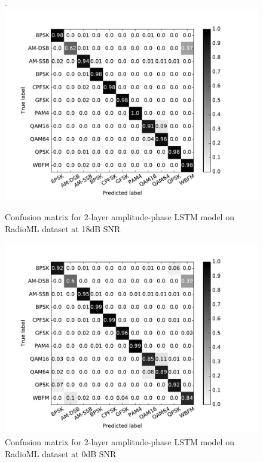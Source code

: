 \begin{figure}[htb]
\centering
-\includegraphics[width=1.1\columnwidth]{figures/confmat_18.pdf}
\caption{Confusion matrix for 2-layer amplitude-phase LSTM model on RadioML dataset at 18dB SNR} 
\label{fig_confmat_18}
\end{figure}

\begin{figure}[htb]
\centering
\includegraphics[width=1.1\columnwidth]{figures/confmat_0.pdf}
\caption{Confusion matrix for 2-layer amplitude-phase LSTM model on RadioML dataset at 0dB SNR} 
\label{fig_confmat_0}
\end{figure}

